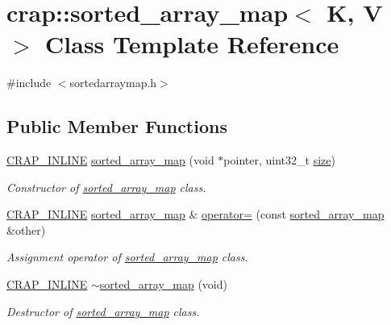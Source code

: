 \hypertarget{classcrap_1_1sorted__array__map}{\section{crap\+:\+:sorted\+\_\+array\+\_\+map$<$ K, V $>$ Class Template Reference}
\label{classcrap_1_1sorted__array__map}
}


{\ttfamily \#include $<$sortedarraymap.\+h$>$}

\subsection*{Public Member Functions}
\begin{DoxyCompactItemize}
\item 
\hyperlink{config__x86_8h_a5a40526b8d842e7ff731509998bb0f1c}{C\+R\+A\+P\+\_\+\+I\+N\+L\+I\+N\+E} \hyperlink{classcrap_1_1sorted__array__map_a9a233164617d4b4337942f07660f0c96}{sorted\+\_\+array\+\_\+map} (void $\ast$pointer, uint32\+\_\+t \hyperlink{classcrap_1_1sorted__array__map_ac22f99bfda9db68c9b72f20cd91ea860}{size})
\begin{DoxyCompactList}\small\item\em Constructor of \hyperlink{classcrap_1_1sorted__array__map}{sorted\+\_\+array\+\_\+map} class. \end{DoxyCompactList}\item 
\hyperlink{config__x86_8h_a5a40526b8d842e7ff731509998bb0f1c}{C\+R\+A\+P\+\_\+\+I\+N\+L\+I\+N\+E} \hyperlink{classcrap_1_1sorted__array__map}{sorted\+\_\+array\+\_\+map} \& \hyperlink{classcrap_1_1sorted__array__map_ae26efcb34dd8867d0a1ee3beaf6bf2e1}{operator=} (const \hyperlink{classcrap_1_1sorted__array__map}{sorted\+\_\+array\+\_\+map} \&other)
\begin{DoxyCompactList}\small\item\em Assignment operator of \hyperlink{classcrap_1_1sorted__array__map}{sorted\+\_\+array\+\_\+map} class. \end{DoxyCompactList}\item 
\hyperlink{config__x86_8h_a5a40526b8d842e7ff731509998bb0f1c}{C\+R\+A\+P\+\_\+\+I\+N\+L\+I\+N\+E} \hyperlink{classcrap_1_1sorted__array__map_a6015049261eab02d8d519c6cdc852abc}{$\sim$sorted\+\_\+array\+\_\+map} (void)
\begin{DoxyCompactList}\small\item\em Destructor of \hyperlink{classcrap_1_1sorted__array__map}{sorted\+\_\+array\+\_\+map} class. \end{DoxyCompactList}\item 

\end{DoxyCompactItemize}
